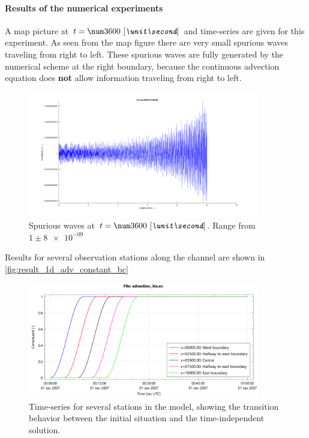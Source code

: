\paragraph*{Results of the numerical experiments}
A map picture at $t=\bqty{3600}{\second}$ and time-series are given for this experiment.
As seen from the map figure there are very small spurious waves traveling from right to left.
These spurious waves are fully generated by the numerical scheme at the right boundary,
because the continuous advection equation does \textbf{not} allow information traveling from right to left.
\begin{figure}[H]
    \centering
    \includegraphics[width=0.9\textwidth]{figures/constant_3600s.png}
    \caption{Spurious waves at $t=\bqty{3600}{\second}$. Range from $ 1 \pm \num{8e-09}$ }
\end{figure}
Results for several observation stations along the channel are shown in \autoref{fig:result_1d_adv_constant_bc}
\begin{figure}[H]
    \centering
    \includegraphics[width=0.9\textwidth]{figures/time-series-advection-constant.pdf}
    \caption{Time-series for several stations in the model, showing the transition behavior between the initial situation and the time-independent solution.}
    \label{fig:result_1d_adv_constant_bc}
\end{figure}
